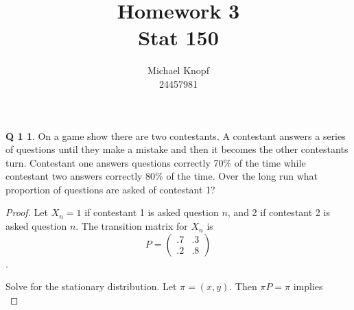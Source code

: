 \documentclass[12pt]{article}
\theoremstyle{definition}
\newtheorem*{prob1}{Q 1}
\begin{document}
\title{Homework 3 \\ Stat 150}
\author{Michael Knopf \\ 24457981}
\maketitle

\begin{prob1}
On a game show there are two contestants. A contestant answers a series of questions until they make a mistake and then it becomes the other contestants turn. Contestant one answers questions correctly 70\% of the time while contestant two answers correctly 80\% of the time. Over the long run what proportion of questions are asked of contestant 1?
\end{prob1}

\begin{proof}

Let $X_n = 1$ if contestant 1 is asked question $n$, and 2 if contestant 2 is asked question $n$.  The transition matrix for $X_n$ is
$$P = \left( \begin{matrix}
.7 & .3 \\
.2 & .8
\end{matrix}
\right)$$.

Solve for the stationary distribution.  Let $\pi = (x, y)$.  Then $\pi P = \pi$ implies
$$

$$

\end{proof}
\end{document}
